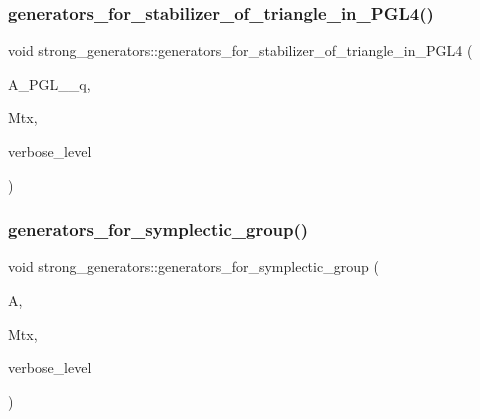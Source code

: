 \mbox{\label{classstrong__generators_ad83abfc0148c2cacdfd34d122e579b0c}} 
\subsubsection{\texorpdfstring{generators\+\_\+for\+\_\+stabilizer\+\_\+of\+\_\+triangle\+\_\+in\+\_\+\+P\+G\+L4()}{generators\_for\_stabilizer\_of\_triangle\_in\_PGL4()}}
{\footnotesize\ttfamily void strong\+\_\+generators\+::generators\+\_\+for\+\_\+stabilizer\+\_\+of\+\_\+triangle\+\_\+in\+\_\+\+P\+G\+L4 (\begin{DoxyParamCaption}\item[{\mbox{\hyperlink{classaction}{action}} $\ast$}]{A\+\_\+\+P\+G\+L\+\_\+\_\+q,  }\item[{\mbox{\hyperlink{classmatrix__group}{matrix\+\_\+group}} $\ast$}]{Mtx,  }\item[{\mbox{\hyperlink{galois_8h_a09fddde158a3a20bd2dcadb609de11dc}{I\+NT}}}]{verbose\+\_\+level }\end{DoxyParamCaption})}

\mbox{\label{classstrong__generators_adcbe973abc9644190864940be0030a2d}} 
\subsubsection{\texorpdfstring{generators\+\_\+for\+\_\+symplectic\+\_\+group()}{generators\_for\_symplectic\_group()}}
{\footnotesize\ttfamily void strong\+\_\+generators\+::generators\+\_\+for\+\_\+symplectic\+\_\+group (\begin{DoxyParamCaption}\item[{\mbox{\hyperlink{classaction}{action}} $\ast$}]{A,  }\item[{\mbox{\hyperlink{classmatrix__group}{matrix\+\_\+group}} $\ast$}]{Mtx,  }\item[{\mbox{\hyperlink{galois_8h_a09fddde158a3a20bd2dcadb609de11dc}{I\+NT}}}]{verbose\+\_\+level }\end{DoxyParamCaption})}

